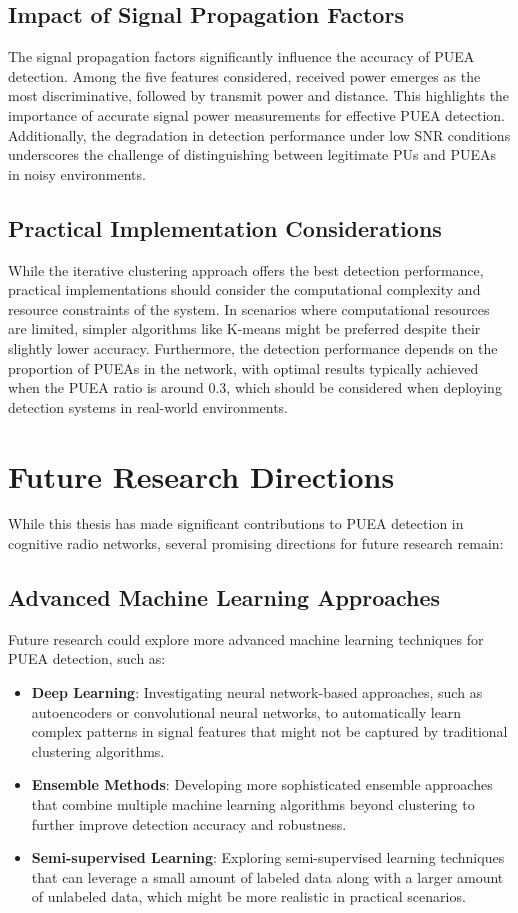 \subsection{Impact of Signal Propagation Factors}
The signal propagation factors significantly influence the accuracy of PUEA detection. Among the five features considered, received power emerges as the most discriminative, followed by transmit power and distance. This highlights the importance of accurate signal power measurements for effective PUEA detection. Additionally, the degradation in detection performance under low SNR conditions underscores the challenge of distinguishing between legitimate PUs and PUEAs in noisy environments.

\subsection{Practical Implementation Considerations}
While the iterative clustering approach offers the best detection performance, practical implementations should consider the computational complexity and resource constraints of the system. In scenarios where computational resources are limited, simpler algorithms like K-means might be preferred despite their slightly lower accuracy. Furthermore, the detection performance depends on the proportion of PUEAs in the network, with optimal results typically achieved when the PUEA ratio is around 0.3, which should be considered when deploying detection systems in real-world environments.

\section{Future Research Directions}
While this thesis has made significant contributions to PUEA detection in cognitive radio networks, several promising directions for future research remain:

\subsection{Advanced Machine Learning Approaches}
Future research could explore more advanced machine learning techniques for PUEA detection, such as:
\begin{itemize}
    \item \textbf{Deep Learning}: Investigating neural network-based approaches, such as autoencoders or convolutional neural networks, to automatically learn complex patterns in signal features that might not be captured by traditional clustering algorithms.
    
    \item \textbf{Ensemble Methods}: Developing more sophisticated ensemble approaches that combine multiple machine learning algorithms beyond clustering to further improve detection accuracy and robustness.
    
    \item \textbf{Semi-supervised Learning}: Exploring semi-supervised learning techniques that can leverage a small amount of labeled data along with a larger amount of unlabeled data, which might be more realistic in practical scenarios.
\end{itemize}


